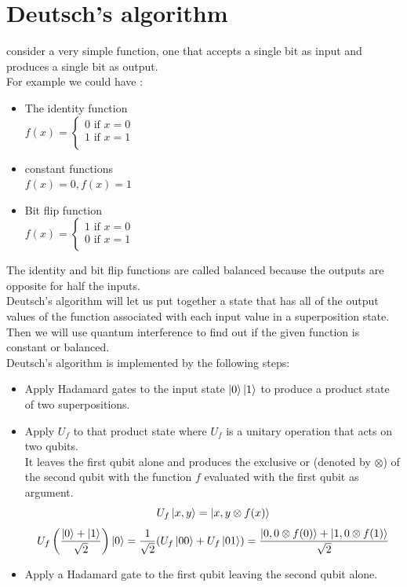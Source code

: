 \documentclass[12pt,oneside]{book}
\begin{document}
\section{Deutsch's algorithm}
consider a very simple function, one that accepts a single bit as input and produces a single bit as output.\\
For example we could have :
\begin{itemize}
    \item The identity function \\
        $f(x) = \begin{cases}
            0 \text{ if } x = 0 \\
            1 \text{ if } x = 1 \\
        \end{cases}$
    \item constant functions \\
     $f(x) = 0 , f(x) = 1$
     \item Bit flip function \\
    $f(x) = \begin{cases}
        1 \text{ if } x =0 \\
        0 \text{ if } x = 1\\
    \end{cases}$
\end{itemize}
The identity and bit flip functions are called balanced because the outputs are opposite for half the inputs.\\

Deutsch's algorithm will let us put together a state that has all of the output values of the function associated with each input value in a superposition state.\\
Then we will use quantum interference to find out if the given function is constant or balanced.\\

Deutsch's algorithm is implemented by the following steps:
\begin{itemize}
    \item Apply Hadamard gates to the input state $\ket{0}\ket{1}$ to produce a product state of two superpositions.
    \item Apply $U_f$ to that product state where $U_f$ is a unitary operation that acts on two qubits.\\
    It leaves the first qubit alone and produces the exclusive or (denoted by $\otimes$) of the second qubit with the function $f$ evaluated with the first qubit as argument.
    \[ U_f\ket{x,y} = \ket{x,y\otimes f(x)}\]
    \[ U_f\left( \frac{\ket{0} + \ket{1}}{\sqrt{2}} \right) \ket{0} = \frac{1}{\sqrt{2}}(U_f\ket{00} + U_f\ket{01}) = \frac{\ket{0,0\otimes f(0)} + \ket{1,0\otimes f(1)} }{\sqrt{2}} \]
    \item Apply a Hadamard gate to the first qubit leaving the second qubit alone.
\end{itemize}
\end{document}
